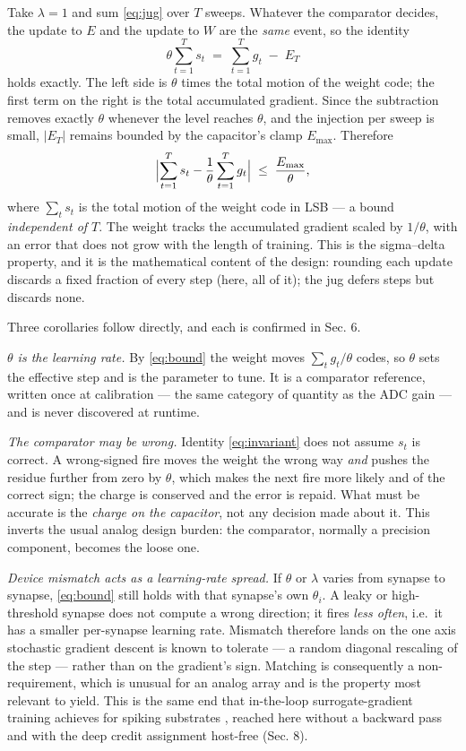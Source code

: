\documentclass[11pt]{article}
\begin{document}
Take \(\lambda = 1\) and sum \eqref{eq:jug} over \(T\) sweeps. Whatever the
comparator decides, the update to \(E\) and the update to \(W\) are the
\emph{same} event, so the identity
\begin{equation}
\theta \sum_{t=1}^{T} s_t \;=\; \sum_{t=1}^{T} g_t \;-\; E_T
\label{eq:invariant}
\end{equation} holds exactly. The left side is \(\theta\) times
the total motion of the weight code; the first term on the right is the
total accumulated gradient. Since the subtraction removes exactly
\(\theta\) whenever the level reaches \(\theta\), and the injection per
sweep is small, \(|E_T|\) remains bounded by the capacitor's clamp
\(E_{\max}\). Therefore
\begin{equation}
\Bigl| \sum_{t=1}^{T} s_t - \frac{1}{\theta}\sum_{t=1}^{T} g_t \Bigr|
\;\le\; \frac{E_{\max}}{\theta},
\label{eq:bound}
\end{equation} where \(\sum_t s_t\) is the total motion of the
weight code in LSB --- a bound \emph{independent of \(T\)}. The weight
tracks the accumulated gradient scaled by \(1/\theta\), with an error
that does not grow with the length of training. This is the sigma--delta
property, and it is the mathematical content of the design: rounding
each update discards a fixed fraction of every step (here, all of it);
the jug defers steps but discards none.

Three corollaries follow directly, and each is confirmed in Sec. 6.

\emph{\(\theta\) is the learning rate.} By \eqref{eq:bound} the weight moves
\(\sum_t g_t/\theta\) codes, so \(\theta\) sets the effective step and
is the parameter to tune. It is a comparator reference, written once at
calibration --- the same category of quantity as the ADC gain --- and is
never discovered at runtime.

\emph{The comparator may be wrong.} Identity \eqref{eq:invariant} does not assume \(s_t\)
is correct. A wrong-signed fire moves the weight the wrong way
\emph{and} pushes the residue further from zero by \(\theta\), which
makes the next fire more likely and of the correct sign; the charge is
conserved and the error is repaid. What must be accurate is the
\emph{charge on the capacitor}, not any decision made about it. This
inverts the usual analog design burden: the comparator, normally a
precision component, becomes the loose one.

\emph{Device mismatch acts as a learning-rate spread.} If \(\theta\) or
\(\lambda\) varies from synapse to synapse, \eqref{eq:bound} still holds with that
synapse's own \(\theta_i\). A leaky or high-threshold synapse does not
compute a wrong direction; it fires \emph{less often}, i.e.~it has a
smaller per-synapse learning rate. Mismatch therefore lands on the one
axis stochastic gradient descent is known to tolerate --- a random
diagonal rescaling of the step --- rather than on the gradient's sign.
Matching is consequently a non-requirement, which is unusual for an
analog array and is the property most relevant to yield. This is the
same end that in-the-loop surrogate-gradient training achieves for
spiking substrates \cite{cramer2022surrogate}, reached here without a
backward pass and with the deep credit assignment host-free (Sec. 8).
\end{document}
